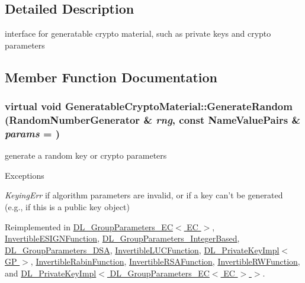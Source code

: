 \subsection{Detailed Description}
interface for generatable crypto material, such as private keys and crypto parameters 

\subsection{Member Function Documentation}
\hypertarget{class_generatable_crypto_material_abe368b52db1ca7079b690f2d6e605f7a}{
\subsubsection[{GenerateRandom}]{\setlength{\rightskip}{0pt plus 5cm}virtual void GeneratableCryptoMaterial::GenerateRandom ({\bf RandomNumberGenerator} \& {\em rng}, \/  const {\bf NameValuePairs} \& {\em params} = {})}}
\label{class_generatable_crypto_material_abe368b52db1ca7079b690f2d6e605f7a}


generate a random key or crypto parameters 
\begin{DoxyExceptions}{Exceptions}
\item[{\em KeyingErr}]if algorithm parameters are invalid, or if a key can't be generated (e.g., if this is a public key object) \end{DoxyExceptions}


Reimplemented in \hyperlink{class_d_l___group_parameters___e_c_a519a33d073fe5bf2f278a0de75a404ab}{DL\_\-GroupParameters\_\-EC$<$ EC $>$}, \hyperlink{class_invertible_e_s_i_g_n_function_a241b733193f9f420f188ca6f57d49c27}{InvertibleESIGNFunction}, \hyperlink{class_d_l___group_parameters___integer_based_a8c9a79c493a215ca37408bb7ddfb5533}{DL\_\-GroupParameters\_\-IntegerBased}, \hyperlink{class_d_l___group_parameters___d_s_a_ac83d3668c342b3a1fb367ed7785e27a3}{DL\_\-GroupParameters\_\-DSA}, \hyperlink{class_invertible_l_u_c_function_af846ecc0f5e8d17267544920bc39f233}{InvertibleLUCFunction}, \hyperlink{class_d_l___private_key_impl_ab80a3771a5ef623677775f7c5dddb1e0}{DL\_\-PrivateKeyImpl$<$ GP $>$}, \hyperlink{class_invertible_rabin_function_a571737380b956b4add10c855484af670}{InvertibleRabinFunction}, \hyperlink{class_invertible_r_s_a_function_a369c37b8f01c8b64f22baa28811ff72f}{InvertibleRSAFunction}, \hyperlink{class_invertible_r_w_function_a8953bb59727e0ae2d79071874a793c48}{InvertibleRWFunction}, and \hyperlink{class_d_l___private_key_impl_ab80a3771a5ef623677775f7c5dddb1e0}{DL\_\-PrivateKeyImpl$<$ DL\_\-GroupParameters\_\-EC$<$ EC $>$ $>$}.

